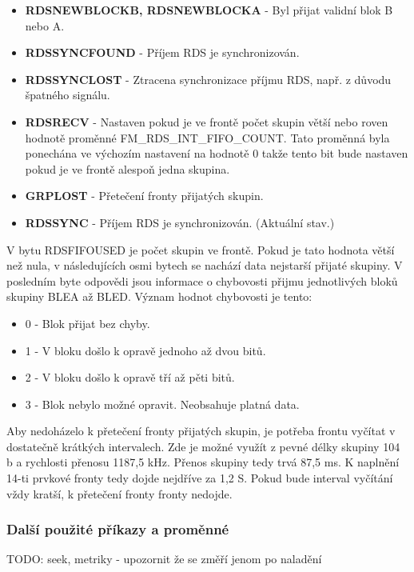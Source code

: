 \begin{itemize}
\item \textbf{RDSNEWBLOCKB, RDSNEWBLOCKA} - Byl přijat validní blok B nebo A.
\item \textbf{RDSSYNCFOUND} - Příjem RDS je synchronizován.
\item \textbf{RDSSYNCLOST} - Ztracena synchronizace příjmu RDS, např. z důvodu špatného signálu.
\item \textbf{RDSRECV} - Nastaven pokud je ve frontě počet skupin větší nebo roven hodnotě proměnné FM\_RDS\_INT\_FIFO\_COUNT. Tato proměnná byla ponechána ve výchozím nastavení na hodnotě 0 takže tento bit bude nastaven pokud je ve frontě alespoň jedna skupina.
\item \textbf{GRPLOST} - Přetečení fronty přijatých skupin.
\item \textbf{RDSSYNC} - Příjem RDS je synchronizován. (Aktuální stav.)
\end{itemize}

V bytu RDSFIFOUSED je počet skupin ve frontě. Pokud je tato hodnota větší než nula, v následujících osmi bytech se nachází data nejstarší přijaté skupiny. V posledním byte odpovědi jsou informace o chybovosti přijmu jednotlivých bloků skupiny BLEA až BLED. Význam hodnot chybovosti je tento:

\begin{itemize}
\item 0 - Blok přijat bez chyby.
\item 1 - V bloku došlo k opravě jednoho až dvou bitů. 
\item 2 - V bloku došlo k opravě tří až pěti bitů.
\item 3 - Blok nebylo možné opravit. Neobsahuje platná data.
\end{itemize} 

Aby nedoházelo k přetečení fronty přijatých skupin, je potřeba frontu vyčítat v dostatečně krátkých intervalech. Zde je možné využít z pevné délky skupiny 104 b a rychlosti přenosu 1187,5 kHz. Přenos skupiny tedy trvá 87,5 ms. K naplnění 14-ti prvkové fronty tedy dojde nejdříve za 1,2 S. Pokud bude interval vyčítání vždy kratší, k přetečení fronty fronty nedojde.

\subsubsection{Další použité příkazy a proměnné}
TODO:
seek, metriky - upozornit že se změří jenom po naladění
